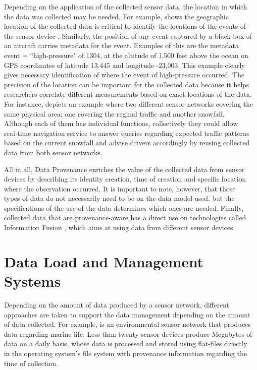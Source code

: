 Depending on the application of the collected sensor data, the location in
which the data was collected may be needed. For example, \cite{sn-geo-metadata}
shows the geographic location of the collected data is critical to identify
the locations of the events of the sensor device \cite{sn-ex02}. Similarly,
the position of any event captured by a black-box of an aircraft carries 
metadata for the event. Examples of this are the metadata event =
``high-pressure" of 1304, at the altitude of 1,500 feet above the ocean on GPS
coordinates of latitude 13.445 and longitude -23,003. This example clearly
gives necessary identification of where the event of high-pressure occurred.
The precision of the location can be important for the collected data because
it helps researchers correlate different measurements based on exact locations
of the data. For instance, \cite{sn-provenance} depicts an example where two
different sensor networks covering the same physical area: one covering the
reginal traffic and another snowfall. Although each of them has individual
functions, collectively they could allow real-time navigation service to answer
queries regarding expected traffic patterns based on the current snowfall and
advise drivers accordingly by reusing collected data from both sensor networks.

All in all, Data Provenance enriches the value of the collected data from
sensor devices by describing its identity creation, time of creation and
specific location where the observation occurred. It is important to note,
however, that those types of data do not necessarily need to be on the data
model used, but the specifications of the use of the data determines which
ones are needed. Finally, collected data that are provenance-aware has a direct
use on technologies called Information Fusion \cite{sn-info-fusion}, which aims
at using data from different sensor devices.

\section{Data Load and Management Systems}
\label{sec:data-load}

Depending on the amount of data produced by a sensor network, different
approaches are taken to support the data management depending on
the amount of data collected. For example, \cite{sfbeams2006} is an
environmental sensor network that produces data regarding marine life.
Less than twenty sensor devices produce Megabytes of data on a daily basis,
whose data is processed and stored using flat-files directly in the
operating system's file system with provenance information regarding the time
of collection.

